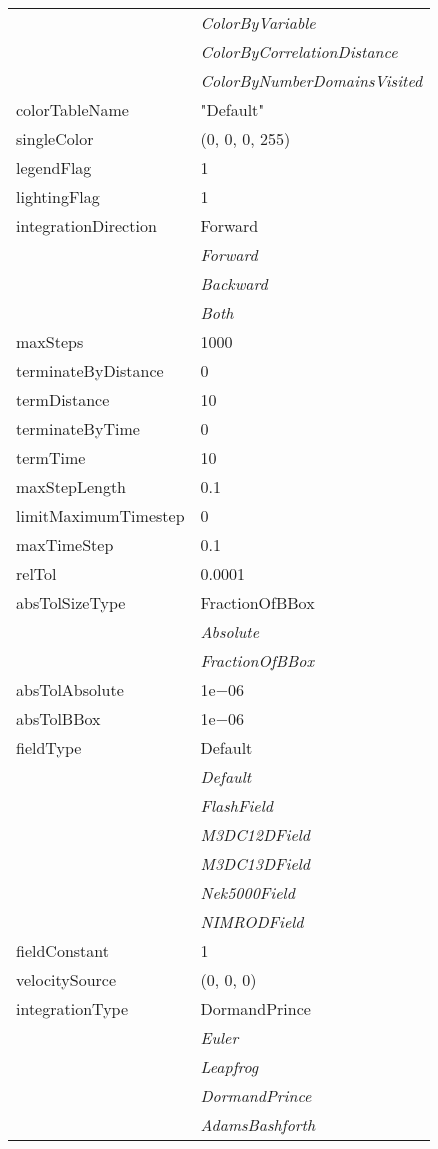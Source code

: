 \documentclass[10pt,a4paper]{report}
\begin{document}
\begin{longtable}{ll}
 & {\it  ColorByVariable} \\
 & {\it  ColorByCorrelationDistance} \\
 & {\it  ColorByNumberDomainsVisited} \\
colorTableName  &  "Default" \\
singleColor  &  (0, 0, 0, 255) \\
legendFlag  &  1 \\
lightingFlag  &  1 \\
integrationDirection  &  Forward   \\
 & {\it  Forward} \\
 & {\it  Backward} \\
 & {\it  Both} \\
maxSteps  &  1000 \\
terminateByDistance  &  0 \\
termDistance  &  10 \\
terminateByTime  &  0 \\
termTime  &  10 \\
maxStepLength  &  0.1 \\
limitMaximumTimestep  &  0 \\
maxTimeStep  &  0.1 \\
relTol  &  0.0001 \\
absTolSizeType  &  FractionOfBBox   \\
 & {\it  Absolute} \\
 & {\it  FractionOfBBox} \\
absTolAbsolute  &  1e$-$06 \\
absTolBBox  &  1e$-$06 \\
fieldType  &  Default   \\
 & {\it  Default} \\
 & {\it  FlashField} \\
 & {\it  M3DC12DField} \\
 & {\it  M3DC13DField} \\
 & {\it  Nek5000Field} \\
 & {\it  NIMRODField} \\
fieldConstant  &  1 \\
velocitySource  &  (0, 0, 0) \\
integrationType  &  DormandPrince   \\
 & {\it  Euler} \\
 & {\it  Leapfrog} \\
 & {\it  DormandPrince} \\
 & {\it  AdamsBashforth} \\

\end{longtable}
\end{document}
